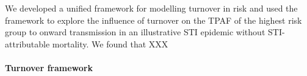 We developed a unified framework for modelling turnover in risk and
used the framework to explore the influence of turnover on 
the TPAF of the highest risk group to onward transmission in an
illustrative STI epidemic without STI-attributable mortality. 
We found that XXX %



\paragraph{Turnover framework}	%


